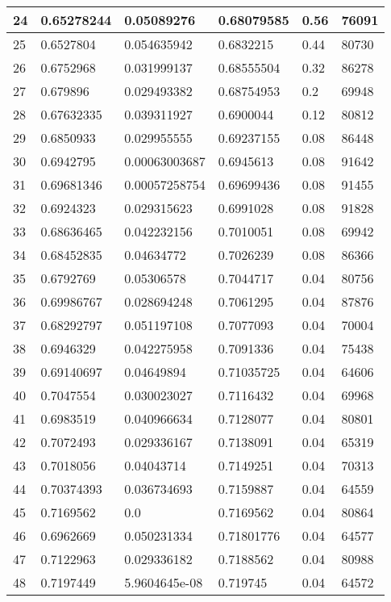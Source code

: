 \begin{longtable}{|l|l|l|l|l|l|}
24 & 0.65278244 & 0.05089276 & 0.68079585 & 0.56 & 76091 \\ \hline 
25 & 0.6527804 & 0.054635942 & 0.6832215 & 0.44 & 80730 \\ \hline 
26 & 0.6752968 & 0.031999137 & 0.68555504 & 0.32 & 86278 \\ \hline 
27 & 0.679896 & 0.029493382 & 0.68754953 & 0.2 & 69948 \\ \hline 
28 & 0.67632335 & 0.039311927 & 0.6900044 & 0.12 & 80812 \\ \hline 
29 & 0.6850933 & 0.029955555 & 0.69237155 & 0.08 & 86448 \\ \hline 
30 & 0.6942795 & 0.00063003687 & 0.6945613 & 0.08 & 91642 \\ \hline 
31 & 0.69681346 & 0.00057258754 & 0.69699436 & 0.08 & 91455 \\ \hline 
32 & 0.6924323 & 0.029315623 & 0.6991028 & 0.08 & 91828 \\ \hline 
33 & 0.68636465 & 0.042232156 & 0.7010051 & 0.08 & 69942 \\ \hline 
34 & 0.68452835 & 0.04634772 & 0.7026239 & 0.08 & 86366 \\ \hline 
35 & 0.6792769 & 0.05306578 & 0.7044717 & 0.04 & 80756 \\ \hline 
36 & 0.69986767 & 0.028694248 & 0.7061295 & 0.04 & 87876 \\ \hline 
37 & 0.68292797 & 0.051197108 & 0.7077093 & 0.04 & 70004 \\ \hline 
38 & 0.6946329 & 0.042275958 & 0.7091336 & 0.04 & 75438 \\ \hline 
39 & 0.69140697 & 0.04649894 & 0.71035725 & 0.04 & 64606 \\ \hline 
40 & 0.7047554 & 0.030023027 & 0.7116432 & 0.04 & 69968 \\ \hline 
41 & 0.6983519 & 0.040966634 & 0.7128077 & 0.04 & 80801 \\ \hline 
42 & 0.7072493 & 0.029336167 & 0.7138091 & 0.04 & 65319 \\ \hline 
43 & 0.7018056 & 0.04043714 & 0.7149251 & 0.04 & 70313 \\ \hline 
44 & 0.70374393 & 0.036734693 & 0.7159887 & 0.04 & 64559 \\ \hline 
45 & 0.7169562 & 0.0 & 0.7169562 & 0.04 & 80864 \\ \hline 
46 & 0.6962669 & 0.050231334 & 0.71801776 & 0.04 & 64577 \\ \hline 
47 & 0.7122963 & 0.029336182 & 0.7188562 & 0.04 & 80988 \\ \hline 
48 & 0.7197449 & 5.9604645e-08 & 0.719745 & 0.04 & 64572 \\ \hline 

\end{longtable}
